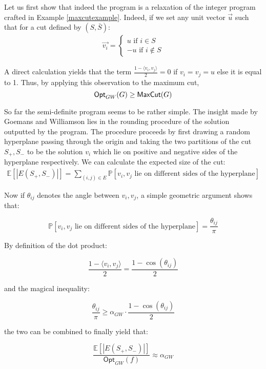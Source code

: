 Let us first show that indeed the program is a relaxation of the integer program crafted in Example \ref{maxcutexample}. Indeed, if we set any unit vector $\vec{u}$ such that for a cut defined by $(S,\bar{S})$:
%
\begin{align*}
  \vec{v_i} = \begin{cases}
                u \text{ if } i \in S \\
                -u \text{ if } i \not\in S
              \end{cases}
\end{align*}

A direct calculation yields that the term $\frac{1 - \langle v_i, v_j \rangle}{2} = 0$ if $v_i = v_j = u$ else it is equal to 1. Thus, by applying this observation to the maximum cut,
%
 \[\mathsf{Opt}_{GW}(G) \geq \mathsf{MaxCut}(G)\]

So far the semi-definite program seems to be rather simple. The insight made by Goemans and Williamson lies in the rounding procedure of the solution outputted by the program. The procedure proceeds by first drawing a random hyperplane passing through the origin and taking the two partitions of the cut $S_+, S_-$ to be the solution $v_i$ which lie on positive and negative sides of the hyperplane respectively. We can calculate the expected size of the cut:
%
\begin{align*}
\mathbb{E}[|E(S_+,S_-)|] = \sum_{(i,j) \in E} \mathbb{P}[v_i,v_j \text{ lie on different sides of the hyperplane}]
\end{align*}

Now if $\theta_{ij}$ denotes the angle between $v_i,v_j$, a simple geometric argument shows that:

\[\mathbb{P}[v_i,v_j \text{ lie on different sides of the hyperplane}] = \frac{\theta_{ij}}{\pi} \]

By definition of the dot product:

\[\frac{1 - \langle v_i, v_j \rangle}{2} =  \frac{1 - \cos(\theta_{ij})}{2} \]

and the magical inequality:

\[ \frac{\theta_{ij}}{\pi} \geq \alpha_{GW} \cdot \frac{1 - \cos(\theta_{ij})}{2}\]

the two can be combined to finally yield that:

\begin{equation}
  \frac{\mathbb{E}[|E(S_+,S_-)|]}{\mathsf{Opt}_{GW}(f)} \approx \alpha_{GW}
\end{equation}

